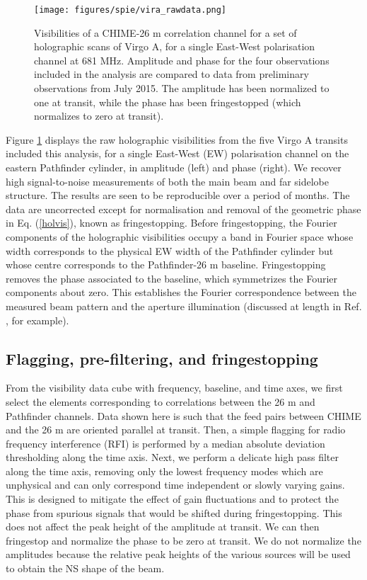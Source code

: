 \begin{figure}[h!]
\centering
\texttt{[image: figures/spie/vira\_rawdata.png]}
\caption{Visibilities of a CHIME-26 m correlation channel for a set of holographic scans of Virgo A, for a single East-West polarisation channel at 681 MHz. Amplitude and phase for the four observations included in the analysis are compared to data from preliminary observations from July 2015. The amplitude has been normalized to one at transit, while the phase has been fringestopped (which normalizes to zero at transit).}
\label{virraw}
\end{figure}

Figure \ref{virraw} displays the raw holographic visibilities from the five Virgo A transits included this analysis, for a single East-West (EW) polarisation channel on the eastern Pathfinder cylinder, in amplitude (left) and phase (right). We recover high signal-to-noise measurements of both the main beam and far sidelobe structure. The results are seen to be reproducible over a period of months. The data are uncorrected except for normalisation and removal of the geometric phase in Eq. (\ref{holvis}), known as fringestopping. Before fringestopping, the Fourier components of the holographic visibilities occupy a band in Fourier space whose width corresponds to the physical EW width of the Pathfinder cylinder but whose centre corresponds to the Pathfinder-26 m baseline. Fringestopping removes the phase associated to the baseline, which symmetrizes the Fourier components about zero. This establishes the Fourier correspondence between the measured beam pattern and the aperture illumination (discussed at length in Ref. \citep{radio2}, for example).

\subsection{Flagging, pre-filtering, and fringestopping}
From the visibility data cube with frequency, baseline, and time axes, we first select the elements corresponding to correlations between the 26 m and Pathfinder channels. Data shown here is such that the feed pairs between CHIME and the 26 m are oriented parallel at transit. Then, a simple flagging for radio frequency interference (RFI) is performed by a median absolute deviation thresholding along the time axis. Next, we perform a delicate high pass filter along the time axis, removing only the lowest frequency modes which are unphysical and can only correspond time independent or slowly varying gains. This is designed to mitigate the effect of gain fluctuations and to protect the phase from spurious signals that would be shifted during fringestopping. This does not affect the peak height of the amplitude at transit. We can then fringestop and normalize the phase to be zero at transit. We do not normalize the amplitudes because the relative peak heights of the various sources will be used to obtain the NS shape of the beam.

